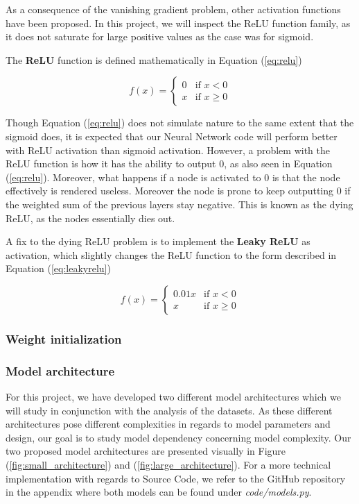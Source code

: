 \documentclass
[twocolumn,
secnumarabic,
nobibnotes,
aps,
prl,
reprint,
groupedaddress,
amsmath,
amssymb
]{revtex4-2}
\begin{document}
As a consequence of the vanishing gradient problem, other activation functions have been proposed. In this project, we will inspect the ReLU function family, as it does not saturate for large positive values as the case was for sigmoid.

The \textbf{ReLU} function is defined mathematically in Equation (\ref{eq:relu})

\begin{equation}
  \label{eq:relu}
  f(x) = 
  \left\{
    \begin{array}{ll}
      0 & \mbox{if } x < 0 \\
      x & \mbox{if } x \geq 0     
    \end{array}
  \right.
\end{equation}

Though Equation (\ref{eq:relu}) does not simulate nature to the same extent that the sigmoid does, it is expected that our Neural Network code will perform better with ReLU activation than sigmoid activation. However, a problem with the ReLU function is how it has the ability to output 0, as also seen in Equation (\ref{eq:relu}). Moreover, what happens if a node is activated to 0 is that the node effectively is rendered useless. Moreover the node is prone to keep outputting 0 if the weighted sum of the previous layers stay negative. This is known as the dying ReLU, as the nodes essentially dies out. 

A fix to the dying ReLU problem is to implement the \textbf{Leaky ReLU} as activation, which slightly changes the ReLU function to the form described in Equation (\ref{eq:leakyrelu})

\begin{equation}
  \label{eq:leakyrelu}
  f(x) = 
  \left\{
    \begin{array}{ll}
      0.01x & \mbox{if } x < 0 \\
      x & \mbox{if } x \geq 0     
    \end{array}
  \right.
\end{equation}

\subsubsection{Weight initialization}

\subsubsection{Model architecture}
For this project, we have developed two different model architectures which we will study in conjunction with the analysis of the datasets. As these different architectures pose different complexities in regards to model parameters and design, our goal is to study model dependency concerning model complexity. Our two proposed model architectures are presented visually in Figure (\ref{fig:small_architecture}) and (\ref{fig:large_architecture}). For a more technical implementation with regards to Source Code, we refer to the GitHub repository in the appendix where both models can be found under \textit{code/models.py}.
\end{document}
